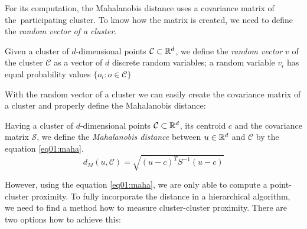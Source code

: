For its computation, the Mahalanobis distance uses a covariance matrix of the~participating cluster. To know how the matrix is created, we need to define the \emph{random vector of a cluster}. 

\begin{defn}
	Given a cluster of $d$-dimensional points $\mathcal{C} \subset \mathbb{R}^d$, we define the \emph{random vector} $v$ of the cluster $\mathcal{C}$ as a vector of $d$ discrete random variables; a random variable $v_i$ has equal probability values $\{o_i:o\in \mathcal{C}\}$
\end{defn}

With the random vector of a cluster we can easily create the covariance matrix of a cluster and properly define the Mahalanobis distance:

\begin{defn}
	Having a cluster of $d$-dimensional points $\mathcal{C} \subset \mathbb{R}^d$, its centroid $c$ and the covariance matrix $\mathcal{S}$, we define the \emph{Mahalanobis distance} between $u \in \mathbb{R}^d$ and $\mathcal{C}$ by the equation \ref{eq01:maha}.
	\begin{equation}\label{eq01:maha}
	d_M(u,\mathcal{C}) = \sqrt{(u-c)^TS^{-1}(u-c)}
	\end{equation}
	\label{def01:maha}
\end{defn}


However, using the equation \ref{eq01:maha}, we are only able to compute a point-cluster proximity. To fully incorporate the distance in a hierarchical algorithm, we need to find a method how to measure cluster-cluster proximity. There are two options how to achieve this:

